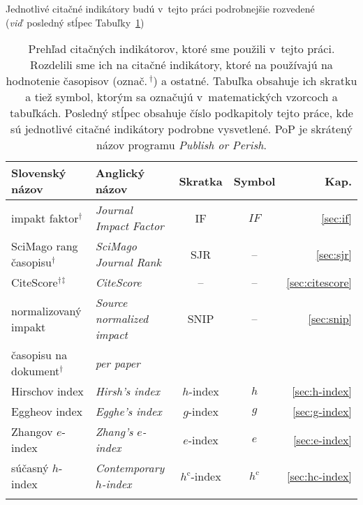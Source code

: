 Jednotlivé citačné indikátory budú v~tejto práci podrobnejšie rozvedené
(\emph{viď}~posledný stĺpec Tabuľky~\ref{tab:indicators.review})

\begin{table}
  \caption[Prehľad citačných indikátorov]%
  {Prehľad citačných indikátorov, ktoré sme použili v~tejto práci.  Rozdelili
    sme ich na citačné indikátory, ktoré na používajú na hodnotenie časopisov
    (označ.\,$^\dagger$) a ostatné.  Tabuľka obsahuje ich skratku a tiež symbol,
    ktorým sa označujú v~matematických vzorcoch a tabuľkách.  Posledný stĺpec
     obsahuje číslo podkapitoly tejto práce, kde sú jednotlivé citačné
    indikátory podrobne vysvetlené.  PoP je skrátený názov programu
    \emph{Publish or Perish}.}
  \label{tab:indicators.review}
  \centering\small
  \begin{tabularx}{\textwidth}{llccr}
    \toprule
    Slovenský  názov & Anglický názov & Skratka & Symbol & Kap. \\
    \midrule
    impakt faktor$^\dagger$         & \emph{Journal Impact Factor}           & IF                  & $\mathit{IF}$     & \ref{sec:if}        \\[0.5ex]
    SciMago rang časopisu$^\dagger$ & \emph{SciMago Journal Rank}            & SJR                 & --                & \ref{sec:sjr}       \\[0.5ex]
    CiteScore$^\dagger$$^\ddagger$    & \emph{CiteScore}                       & --                  & --               & \ref{sec:citescore}  \\[0.5ex]
    normalizovaný impakt           & \emph{Source normalized impact}        & SNIP                & --                & \ref{sec:snip}      \\[-0.25ex]
    časopisu  na dokument$^\dagger$  & \emph{per paper}                       &                     &                   &                     \\[0.5ex]
    Hirschov index                 & \emph{Hirsh's index}                   & $h$-index           & $h$                & \ref{sec:h-index}  \\[1.5ex]
    Eggheov index                  & \emph{Egghe's index}                   & $g$-index           & $g$                & \ref{sec:g-index}  \\[0.5ex]
    Zhangov $e$-index              & \emph{Zhang's $e$-index}               & $e$-index           & $e$                & \ref{sec:e-index}  \\[0.5ex]
    súčasný $h$-index              & \emph{Contemporary $h$-index}          & $h^{\mathrm{c}}$-index & $h^{\mathrm{c}}$     & \ref{sec:hc-index}  \\[0.5ex]
$$
\end{tabularx}
\end{table}
